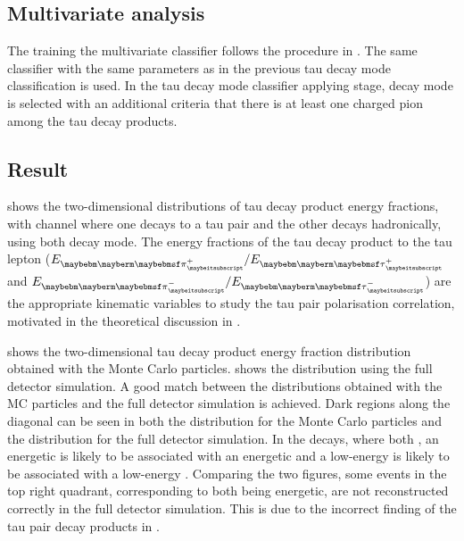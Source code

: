 \subsection{Multivariate analysis}

The training  the multivariate classifier follows the procedure in  . The same classifier with the same parameters as in the previous tau decay mode classification  is used.   In the tau decay mode classifier applying stage, \tauToPion decay mode is selected with an additional criteria that there is at least one charged pion among the tau decay products.

\subsection{Result}

 shows the two-dimensional distributions of  tau decay product energy fractions, with \eeZZ channel where one \PZ decays to a tau pair and the other \PZ decays hadronically, using both \tauToPion decay mode. The energy fractions of the tau decay product to the tau lepton ($E_{\Ppiplus} / E_{\APtauon}$ and $E_{\Ppiminus} / E_{\Ptauon}$) are the appropriate kinematic variables to study the tau pair polarisation correlation, motivated in the theoretical discussion in .

 shows the  two-dimensional  tau decay product energy fraction distribution obtained with the Monte Carlo particles.  shows the distribution using the full detector simulation. A good match between the distributions obtained with  the MC particles and the full detector simulation is achieved. Dark regions along the diagonal can be seen in both the distribution for the Monte Carlo particles and the distribution for the full detector simulation. In the \ZToTauTau decays, where both \tauToPion, an energetic \Pgppm is likely to be associated with an energetic \Pgpmp and a low-energy \Pgppm is  likely to be associated with a low-energy \Pgpmp. Comparing the two figures, some events in the top right quadrant, corresponding to  both \Ppipm being energetic, are not reconstructed correctly in the full detector simulation. This is due to the incorrect finding of the tau pair decay products  in .



